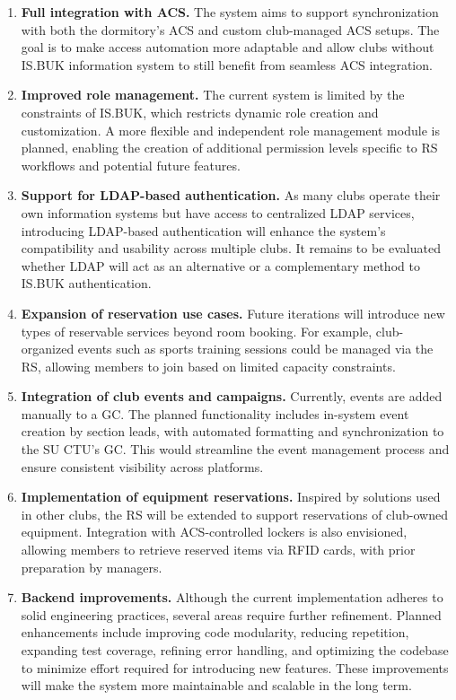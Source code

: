 \begin{enumerate}
    \item \textbf{Full integration with ACS.} The system aims to support synchronization with both the dormitory’s ACS and custom club-managed ACS setups. The goal is to make access automation more adaptable and allow clubs without IS.BUK information system to still benefit from seamless ACS integration. 

    \item \textbf{Improved role management.} The current system is limited by the constraints of IS.BUK, which restricts dynamic role creation and customization. A more flexible and independent role management module is planned, enabling the creation of additional permission levels specific to RS workflows and potential future features.
    \newpage
    \item \textbf{Support for LDAP-based authentication.} As many clubs operate their own information systems but have access to centralized LDAP services, introducing LDAP-based authentication will enhance the system’s compatibility and usability across multiple clubs. It remains to be evaluated whether LDAP will act as an alternative or a complementary method to IS.BUK authentication.
  
    \item \textbf{Expansion of reservation use cases.} Future iterations will introduce new types of reservable services beyond room booking. For example, club-organized events such as sports training sessions could be managed via the RS, allowing members to join based on limited capacity constraints.

    \item \textbf{Integration of club events and campaigns.} Currently, events are added manually to a GC. The planned functionality includes in-system event creation by section leads, with automated formatting and synchronization to the SU CTU's GC. This would streamline the event management process and ensure consistent visibility across platforms.

    \item \textbf{Implementation of equipment reservations.} Inspired by solutions used in other clubs, the RS will be extended to support reservations of club-owned equipment. Integration with ACS-controlled lockers is also envisioned, allowing members to retrieve reserved items via RFID cards, with prior preparation by managers.

    \item \textbf{Backend improvements.} Although the current implementation adheres to solid engineering practices, several areas require further refinement. Planned enhancements include improving code modularity, reducing repetition, expanding test coverage, refining error handling, and optimizing the codebase to minimize effort required for introducing new features. These improvements will make the system more maintainable and scalable in the long term.
\end{enumerate}

